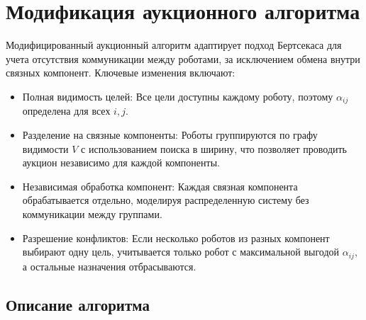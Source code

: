 \section{Модификация аукционного алгоритма}

Модифицированный аукционный алгоритм адаптирует подход Бертсекаса \cite{bertsekas1990} для учета отсутствия коммуникации между роботами, за исключением обмена внутри связных компонент. Ключевые изменения включают:
\begin{itemize}
    \item Полная видимость целей: Все цели доступны каждому роботу, поэтому \( \alpha_{ij} \) определена для всех \( i, j \).
    \item Разделение на связные компоненты: Роботы группируются по графу видимости \( V \) с использованием поиска в ширину, что позволяет проводить аукцион независимо для каждой компоненты.
    \item Независимая обработка компонент: Каждая связная компонента обрабатывается отдельно, моделируя распределенную систему без коммуникации между группами.
    \item Разрешение конфликтов: Если несколько роботов из разных компонент выбирают одну цель, учитывается только робот с максимальной выгодой \( \alpha_{ij} \), а остальные назначения отбрасываются.
\end{itemize}

\subsection{Описание алгоритма}

